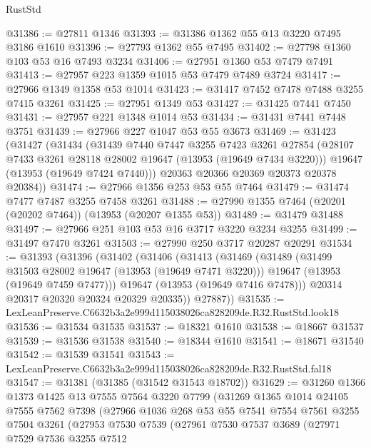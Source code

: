 \begin{lexlean}{RustStd}
\begin{coremodule}
@31386 := @27811 @1346
@31393 := @31386 @1362 @55 @13 @3220 @7495 @3186 @1610
@31396 := @27793 @1362 @55 @7495
@31402 := @27798 @1360 @103 @53 @16 @7493 @3234
@31406 := @27951 @1360 @53 @7479 @7491
@31413 := @27957 @223 @1359 @1015 @53 @7479 @7489 @3724
@31417 := @27966 @1349 @1358 @53 @1014
@31423 := @31417 @7452 @7478 @7488 @3255 @7415 @3261
@31425 := @27951 @1349 @53
@31427 := @31425 @7441 @7450
@31431 := @27957 @221 @1348 @1014 @53
@31434 := @31431 @7441 @7448 @3751
@31439 := @27966 @227 @1047 @53 @55 @3673
@31469 := @31423
    (@31427
      (@31434
        (@31439
          @7440
          @7447
          @3255
          @7423
          @3261
          @27854
          (@28107 @7433 @3261 @28118 @28002 @19647 (@13953 (@19649 @7434 @3220)))
          @19647
          (@13953 (@19649 @7424 @7440)))
        @20363
        @20366
        @20369
        @20373
        @20378
        @20384))
@31474 := @27966 @1356 @253 @53 @55 @7464
@31479 := @31474 @7477 @7487 @3255 @7458 @3261
@31488 := @27990 @1355 @7464 (@20201 (@20202 @7464)) (@13953 (@20207 @1355 @53))
@31489 := @31479 @31488
@31497 := @27966 @251 @103 @53 @16 @3717 @3220 @3234 @3255
@31499 := @31497 @7470 @3261
@31503 := @27990 @250 @3717 @20287 @20291
@31534 := @31393
    (@31396
      (@31402
        (@31406
          (@31413
            (@31469
              (@31489
                (@31499 @31503 @28002 @19647 (@13953 (@19649 @7471 @3220)))
                @19647
                (@13953 (@19649 @7459 @7477)))
              @19647
              (@13953 (@19649 @7416 @7478)))
            @20314
            @20317
            @20320
            @20324
            @20329
            @20335))
        @27887))
@31535 := LexLeanPreserve.C6632b3a2e999d115038026ca828209de.R32.RustStd.look18
@31536 := @31534 @31535
@31537 := @18321 @1610
@31538 := @18667 @31537
@31539 := @31536 @31538
@31540 := @18344 @1610
@31541 := @18671 @31540
@31542 := @31539 @31541
@31543 := LexLeanPreserve.C6632b3a2e999d115038026ca828209de.R32.RustStd.fal18
@31547 := @31381 (@31385 (@31542 @31543 @18702))
@31629 := @31260
    @1366
    @1373
    @1425
    @13
    @7555
    @7564
    @3220
    @7799
    (@31269
      @1365
      @1014
      @24105
      @7555
      @7562
      @7398
      (@27966
        @1036
        @268
        @53
        @55
        @7541
        @7554
        @7561
        @3255
        @7504
        @3261
        (@27953
          @7530
          @7539
          (@27961
            @7530
            @7537
            @3689
            (@27971
              @7529
              @7536
              @3255
              @7512

\end{coremodule}
\end{lexlean}
